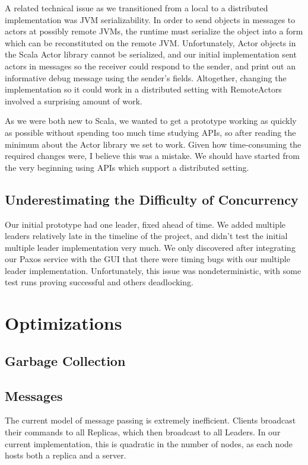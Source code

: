 \documentclass{sig-alternate}
\begin{document}
A related technical issue as we transitioned from a local to a distributed implementation was JVM serializability. In order to send objects in messages to actors at possibly remote JVMs, the runtime must serialize the object into a form which can be reconstituted on the remote JVM. Unfortunately, Actor objects in the Scala Actor library cannot be serialized, and our initial implementation sent actors in messages so the receiver could respond to the sender, and print out an informative debug message using the sender's fields. Altogether, changing the implementation so it could work in a distributed setting with RemoteActors involved a surprising amount of work. 

As we were both new to Scala, we wanted to get a prototype working as quickly as possible without spending too much time studying APIs, so after reading the minimum about the Actor library we set to work. Given how time-consuming the required changes were, I believe this was a mistake. We should have started from the very beginning using APIs which support a distributed setting.

\subsection{Underestimating the Difficulty of Concurrency}
Our initial prototype had one leader, fixed ahead of time. We added multiple leaders relatively late in the timeline of the project, and didn't test the initial multiple leader implementation very much. We only discovered after integrating our Paxos service with the GUI that there were timing bugs with our multiple leader implementation. Unfortunately, this issue was nondeterministic, with some test runs proving successful and others deadlocking. 


\section{Optimizations}

\subsection{Garbage Collection}

\subsection{Messages}

The current model of message passing is extremely inefficient. Clients broadcast their commands to all Replicas, which then broadcast to all Leaders. In our current implementation, this is quadratic in the number of nodes, as each node hosts both a replica and a server. 
\end{document}
